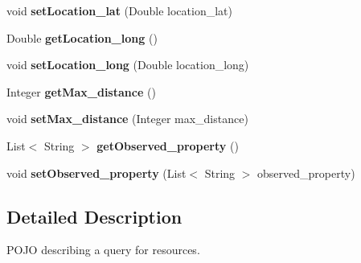 \begin{DoxyCompactItemize}
\item 
void {\bfseries set\+Location\+\_\+lat} (Double location\+\_\+lat)\hypertarget{classeu_1_1h2020_1_1symbiote_1_1model_1_1QueryRequest_ab8d0fcd9558a77eb8e151b6ef9f29e20}{}\label{classeu_1_1h2020_1_1symbiote_1_1model_1_1QueryRequest_ab8d0fcd9558a77eb8e151b6ef9f29e20}

\item 
Double {\bfseries get\+Location\+\_\+long} ()\hypertarget{classeu_1_1h2020_1_1symbiote_1_1model_1_1QueryRequest_ac121aefbf1ac3fbd60c2d32f84c4a6d7}{}\label{classeu_1_1h2020_1_1symbiote_1_1model_1_1QueryRequest_ac121aefbf1ac3fbd60c2d32f84c4a6d7}

\item 
void {\bfseries set\+Location\+\_\+long} (Double location\+\_\+long)\hypertarget{classeu_1_1h2020_1_1symbiote_1_1model_1_1QueryRequest_a889ffdfe8e04d1d1aeda8c878c06cc95}{}\label{classeu_1_1h2020_1_1symbiote_1_1model_1_1QueryRequest_a889ffdfe8e04d1d1aeda8c878c06cc95}

\item 
Integer {\bfseries get\+Max\+\_\+distance} ()\hypertarget{classeu_1_1h2020_1_1symbiote_1_1model_1_1QueryRequest_ae5f864f642be01630dda7520e8699c76}{}\label{classeu_1_1h2020_1_1symbiote_1_1model_1_1QueryRequest_ae5f864f642be01630dda7520e8699c76}

\item 
void {\bfseries set\+Max\+\_\+distance} (Integer max\+\_\+distance)\hypertarget{classeu_1_1h2020_1_1symbiote_1_1model_1_1QueryRequest_a03d118b567870e8fbc6b5354fc48b27a}{}\label{classeu_1_1h2020_1_1symbiote_1_1model_1_1QueryRequest_a03d118b567870e8fbc6b5354fc48b27a}

\item 
List$<$ String $>$ {\bfseries get\+Observed\+\_\+property} ()\hypertarget{classeu_1_1h2020_1_1symbiote_1_1model_1_1QueryRequest_adbe844062ba68f419ab084ee28a75030}{}\label{classeu_1_1h2020_1_1symbiote_1_1model_1_1QueryRequest_adbe844062ba68f419ab084ee28a75030}

\item 
void {\bfseries set\+Observed\+\_\+property} (List$<$ String $>$ observed\+\_\+property)\hypertarget{classeu_1_1h2020_1_1symbiote_1_1model_1_1QueryRequest_a62687b46f38f04675fc389a015122cfa}{}\label{classeu_1_1h2020_1_1symbiote_1_1model_1_1QueryRequest_a62687b46f38f04675fc389a015122cfa}

\end{DoxyCompactItemize}


\subsection{Detailed Description}
P\+O\+JO describing a query for resources. 

